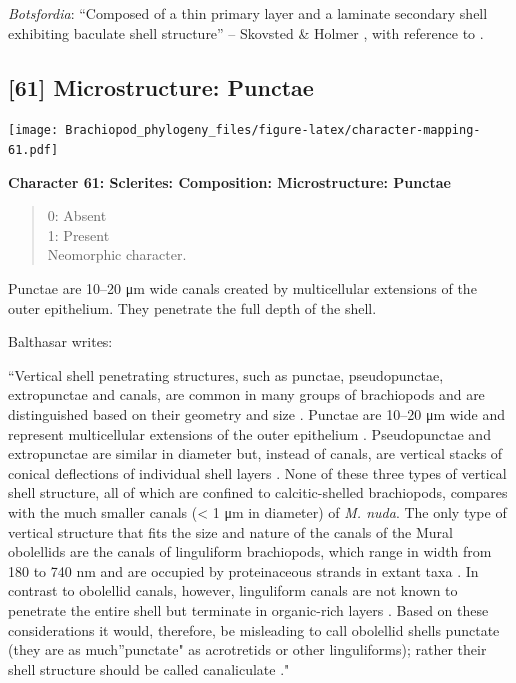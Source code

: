 \documentclass[]{book}
\theoremstyle{definition}
\theoremstyle{definition}
\theoremstyle{definition}
\theoremstyle{remark}
\begin{document}
\emph{Botsfordia}: ``Composed of a thin primary layer and a laminate
secondary shell exhibiting baculate shell structure'' -- Skovsted \&
Holmer \citeyearpar{Skovsted2005EarlyCambrian}, with reference to
\citet{Skovsted2003EarlyCambrian}.

\hypertarget{microstructure-punctae}{%
\subsection*{{[}61{]} Microstructure:
Punctae}\label{microstructure-punctae}}

\texttt{[image: Brachiopod\_phylogeny\_files/figure-latex/character-mapping-61.pdf]}

\textbf{Character 61: Sclerites: Composition: Microstructure: Punctae}

\begin{quote}
0: Absent\\
1: Present\\
Neomorphic character.
\end{quote}

Punctae are 10--20 μm wide canals created by multicellular extensions of
the outer epithelium. They penetrate the full depth of the shell.

Balthasar \citeyearpar{Balthasar2008iMummpikia} writes:

``Vertical shell penetrating structures, such as punctae, pseudopunctae,
extropunctae and canals, are common in many groups of brachiopods and
are distinguished based on their geometry and size
\citep{Williams1997BrachiopodaRevised}. Punctae are 10--20 μm wide and
represent multicellular extensions of the outer epithelium
\citep{Owen1969Thecaecum}. Pseudopunctae and extropunctae are similar in
diameter but, instead of canals, are vertical stacks of conical
deflections of individual shell layers \citep{Williams1993Roleof}. None
of these three types of vertical shell structure, all of which are
confined to calcitic-shelled brachiopods, compares with the much smaller
canals (\textless{} 1 μm in diameter) of \emph{M. nuda}. The only type
of vertical structure that fits the size and nature of the canals of the
Mural obolellids are the canals of linguliform brachiopods, which range
in width from 180 to 740 nm and are occupied by proteinaceous strands in
extant taxa
\citep{Williams1992Structureof, Williams1994Collagenouschitino, Williams1997BrachiopodaRevised}.
In contrast to obolellid canals, however, linguliform canals are not
known to penetrate the entire shell but terminate in organic-rich layers
\citep{Williams1997BrachiopodaRevised}. Based on these considerations it
would, therefore, be misleading to call obolellid shells punctate (they
are as much''punctate" as acrotretids or other linguliforms); rather
their shell structure should be called canaliculate
\citep{Williams1997BrachiopodaRevised}."
\end{document}
